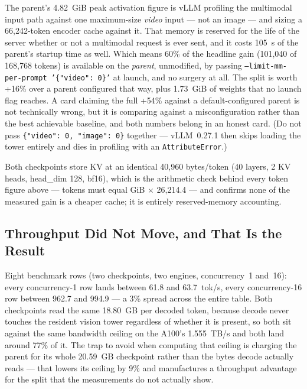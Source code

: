 \documentclass[11pt]{article}
\begin{document}
The parent's 4.82~GiB peak activation figure is vLLM profiling the multimodal input
path against one maximum-size \emph{video} input --- not an image --- and sizing a
66,242-token encoder cache against it. That memory is reserved for the life of the
server whether or not a multimodal request is ever sent, and it costs 105~s of the
parent's startup time as well. Which means 60\% of the headline gain
(101,040 of 168,768 tokens) is available on the \emph{parent}, unmodified, by passing
\texttt{--limit-mm-per-prompt '\{"video": 0\}'} at launch, and no surgery at all. The
split is worth +16\% over a parent configured that way, plus 1.73~GiB of weights that no
launch flag reaches. A card claiming the full +54\% against a default-configured parent
is not technically wrong, but it is comparing against a misconfiguration rather than the
best achievable baseline, and both numbers belong in an honest card. (Do not pass
\texttt{\{"video": 0, "image": 0\}} together --- vLLM~0.27.1 then skips loading the
tower entirely and dies in profiling with an \texttt{AttributeError}.)

Both checkpoints store KV at an identical 40,960 bytes/token (40 layers, 2 KV heads,
head\_dim 128, bf16), which is the arithmetic check behind every token figure above ---
tokens must equal GiB $\times$ 26{,}214.4 --- and confirms none of the measured gain is a
cheaper cache; it is entirely reserved-memory accounting.

\subsection{Throughput Did Not Move, and That Is the Result}

Eight benchmark rows (two checkpoints, two engines, concurrency~1 and~16): every
concurrency-1 row lands between 61.8 and 63.7~tok/s, every concurrency-16 row between
962.7 and 994.9 --- a 3\% spread across the entire table. Both checkpoints read the same
18.80~GB per decoded token, because decode never touches the resident vision tower
regardless of whether it is present, so both sit against the same bandwidth ceiling on
the A100's 1.555~TB/s and both land around 77\% of it. The trap to avoid when computing
that ceiling is charging the parent for its whole 20.59~GB checkpoint rather than the
bytes decode actually reads --- that lowers its ceiling by 9\% and manufactures a
throughput advantage for the split that the measurements do not actually show.
\end{document}
